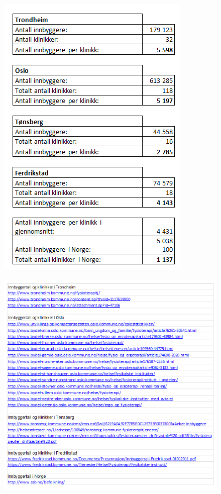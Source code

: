 \begin{figure}
\begin{center}
\includegraphics[scale=0.8]{antallklinikker}
\label{fig:clinics}
\end{center}
\end{figure}

\begin{figure}
\begin{center}
\includegraphics[scale=0.8]{kilder}
\label{fig:sources}
\end{center}
\end{figure}



